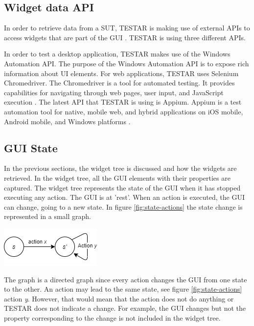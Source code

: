 \subsection{Widget data API}

In order to retrieve data from a SUT, TESTAR is making use of external APIs to access widgets that are part of the GUI \cite{thesisMulders}. TESTAR is using three different APIs.

In order to test a desktop application, TESTAR makes use of the Windows Automation API. The purpose of the Windows Automation API is to expose rich information about UI elements\cite{win-api-info}. For web applications, TESTAR uses Selenium Chromedriver. The Chromedriver is a tool for automated testing. It provides capabilities for navigating through web pages, user input, and JavaScript execution \cite{chrome-driver-info}. The latest API that TESTAR is using is Appium. Appium is a test automation tool for native, mobile web, and hybrid applications on iOS mobile, Android mobile, and Windows platforms \cite{appium-info}.

\subsection{GUI State} \label{gui-state}
In the previous sections, the widget tree is discussed and how the widgets are retrieved. In the widget tree, all the GUI elements with their properties are captured. The widget tree represents the state of the GUI when it has stopped executing any action. The GUI is at 'rest'. When an action is executed, the GUI can change, going to a new state. In figure \ref{fig:state-actions} the state change is represented in a small graph. 

\bigskip
\begingroup
\captionsetup{type=figure}
\includegraphics{pics/state-action.png}
\label{fig:state-actions}
\endgroup

The graph is a directed graph since every action changes the GUI from one state to the other. An action may lead to the same state, see figure \ref{fig:state-actions} action \textit{y}. However, that would mean that the action does not do anything or TESTAR does not indicate a change. For example, the GUI changes but not the property corresponding to the change is not included in the widget tree.

